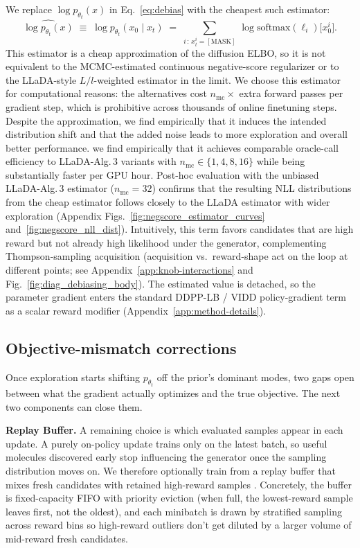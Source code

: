 We replace $\log p_{\theta_t}(x)$ in Eq.~\ref{eq:debias} with the cheapest such estimator: 
\[
\widehat{\log p_{\theta_t}(x)} \;\equiv\; \log p_{\theta_t}(x_0 \mid x_t)
\;=\;
\textstyle\sum_{i \,:\, x_t^i = [\text{MASK}]}\, \log \mathrm{softmax}(\ell_i)\bigl[x_0^i\bigr].
\]
This estimator is a cheap approximation of the diffusion ELBO, so it is not equivalent to the MCMC-estimated continuous negative-score regularizer or to the LLaDA-style $L/l$-weighted estimator in the limit. We choose this estimator  for computational reasons: the alternatives cost $n_{\text{mc}}\!\times$ extra forward passes per gradient step, which is prohibitive across thousands of online finetuning steps. Despite the approximation, we find empirically that it induces the intended distribution shift and that the added noise leads to more exploration and overall better performance. we find empirically that it achieves comparable oracle-call efficiency to LLaDA-Alg.\,3 variants with $n_{\text{mc}} \in \{1, 4, 8, 16\}$ while being substantially faster per GPU hour. Post-hoc evaluation with the unbiased LLaDA-Alg.\,3 estimator ($n_{\text{mc}}{=}32$) confirms that the resulting NLL distributions from the cheap estimator follows closely to the LLaDA estimator with wider exploration (Appendix Figs.~\ref{fig:negscore_estimator_curves} and~\ref{fig:negscore_nll_dist}).
Intuitively, this term favors candidates that are high reward but not already high likelihood under the generator, complementing Thompson-sampling acquisition (acquisition vs.\ reward-shape act on the loop at different points; see Appendix~\ref{app:knob-interactions} and Fig.~\ref{fig:diag_debiasing_body}).
The estimated value is detached, so the parameter gradient enters the standard DDPP-LB / VIDD policy-gradient term as a scalar reward modifier  (Appendix~\ref{app:method-details}).


\subsection{Objective-mismatch corrections}\label{sec:design-objmismatch}

Once exploration starts shifting $p_{\theta_t}$ off the prior's dominant modes, two gaps open between what the gradient actually optimizes and the true objective. The next two components can close them.

\textbf{Replay Buffer.}
A remaining choice is which evaluated samples appear in each update. A purely on-policy update trains only on the latest batch, so useful molecules discovered early stop influencing the generator once the sampling distribution moves on. We therefore optionally train from a replay buffer that mixes fresh candidates with retained high-reward samples \citep{mnih2015human, schaul2016prioritized, olivecronaMolecularNovoDesign2017}. Concretely, the buffer is fixed-capacity FIFO with priority eviction (when full, the lowest-reward sample leaves first, not the oldest), and each minibatch is drawn by stratified sampling across reward bins so high-reward outliers don't get diluted by a larger volume of mid-reward fresh candidates.

